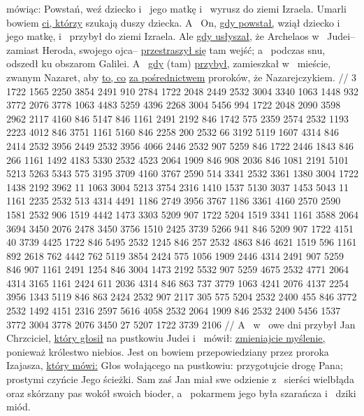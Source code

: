  mówiąc: Powstań, weź dziecko i~ jego matkę i~ wyrusz do ziemi Izraela. Umarli bowiem \underline{ci, którzy} szukają duszy dziecka.
 A~ On, \underline{gdy powstał,} wziął dziecko i~ jego matkę, i~ przybył do ziemi Izraela.
 Ale \underline{gdy usłyszał,} że Archelaos  w~ Judei– zamiast Heroda, swojego ojca– \underline{przestraszył się} tam wejść; a~  podczas snu, odszedł ku obszarom Galilei.
 A~ \underline{gdy} (tam) \underline{przybył,} zamieszkał w~ mieście, zwanym Nazaret, aby  \underline{to, co}  \underline{za pośrednictwem} proroków, że  Nazarejczykiem.
//
\endgl
\begingl
\lettrine[loversize=1,lraise=-1.3]{3 }{}%
 1722 1565 2250 3854 2491 910 2784 1722 2048 2449
{} 2532 3004 3340 1063 1448 932 3772
{} 2076 3778 1063 4483 5259 4396 2268 3004 5456 994 1722 2048 2090 3598 2962 2117 4160 846 5147
{} 846 1161 2491 2192 846 1742 575 2359 2574 2532 1193 2223 4012 846 3751 1161 5160 846 2258 200 2532 66 3192
{} 5119 1607 4314 846 2414 2532 3956 2449 2532 3956 4066 2446
{} 2532 907 5259 846 1722 2446 1843 846 266
{} 1161 1492 4183 5330 2532 4523 2064 1909 {} 846 908 2036 846 1081 2191 5101 5213 5263 5343 575 3195 3709
{} 4160 3767 2590 514 3341
{} 2532 3361 1380 {} 3004 1722 1438 2192 3962 11 1063 3004 5213 3754 2316 1410 1537 5130 3037 1453 5043 11
{} 1161 2235 2532 513 4314 4491 1186 2749 3956 3767 1186 3361 4160 2570 2590 1581 2532 906 1519 4442
{} 1473 3303 5209 907 1722 5204 1519 3341 1161 3588 2064 3694 3450 2076 2478 3450 3756 1510 2425 {} 3739 5266 941 846 5209 907 1722 4151 40
{} 3739 4425 1722 846 5495 2532 1245 846 257 2532 4863 846 4621 1519 596 1161 892 2618 762 4442 762
{} 5119 3854 2424 575 1056 1909 2446 4314 2491 907 5259 846 907
{} 1161 2491 1254 846 3004 1473 2192 5532 {} 907 5259 4675 2532 4771 2064 4314 3165
{} 1161 2424 611 2036 4314 846 863 737 3779 1063 4241 2076 4137 2254 3956 1343 5119 846 863
{} 2424 2532 907 2117 305 575 5204 2532 2400 455 846 3772 2532 1492 4151 2316 2597 5616 4058 2532 2064 1909 846
{} 2532 2400 5456 1537 3772 3004 3778 2076 3450 27 5207 1722 3739 2106
//
\glb
 A~ w~ owe dni przybył Jan Chrzciciel, \underline{który głosił} na pustkowiu Judei
 i~ mówił: \underline{zmieniajcie myślenie,} ponieważ  królestwo niebios.
 Jest on bowiem przepowiedziany przez proroka Izajasza, \underline{który mówi:} Głos wołającego na pustkowiu: przygotujcie drogę Pana; prostymi czyńcie Jego ścieżki.
 Sam zaś Jan miał swe odzienie z~ sierści wielbłąda oraz skórzany pas wokół swoich bioder, a~ pokarmem jego była szarańcza i~ dziki miód.
